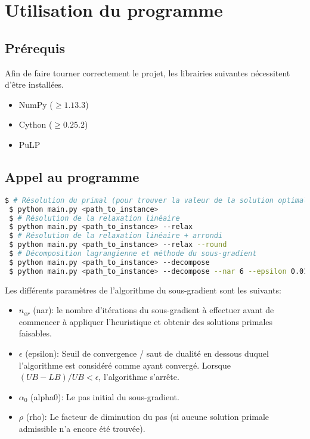\chapter{Utilisation du programme}
\vspace*{1.2cm}
 
 
\section{Prérequis}
 
Afin de faire tourner correctement le projet, les librairies suivantes nécessitent d'être installées.
\begin{itemize}
 \item NumPy ($\geq 1.13.3$)
 \item Cython ($ \geq 0.25.2$)
 \item PuLP
\end{itemize}
 
\section{Appel au programme}
 
\begin{lstlisting}[language=bash]
 $ # Résolution du primal (pour trouver la valeur de la solution optimale)
 $ python main.py <path_to_instance>
 $ # Résolution de la relaxation linéaire
 $ python main.py <path_to_instance> --relax
 $ # Résolution de la relaxation linéaire + arrondi
 $ python main.py <path_to_instance> --relax --round
 $ # Décomposition lagrangienne et méthode du sous-gradient
 $ python main.py <path_to_instance> --decompose
 $ python main.py <path_to_instance> --decompose --nar 6 --epsilon 0.01 --alpha0 2000 --rho 0.96
\end{lstlisting}
 
Les différents paramètres de l'algorithme du sous-gradient sont les suivants:
\begin{itemize}
    \item $n_{ar}$ (nar): le nombre d'itérations du sous-gradient à effectuer avant de commencer à appliquer
   l'heuristique et obtenir des solutions primales faisables.
    \item $\epsilon$ (epsilon): Seuil de convergence / saut de dualité en dessous duquel l'algorithme est considéré comme
   ayant convergé. Lorsque $(UB - LB) / UB  < \epsilon$, l'algorithme s'arrête.
   \item $\alpha_0$ (alpha0): Le pas initial du sous-gradient.
   \item $\rho$ (rho): Le facteur de diminution du pas (si aucune solution primale admissible n'a encore été trouvée).
\end{itemize}